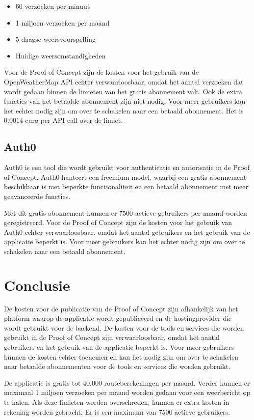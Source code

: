 \begin{itemize}
    \item 60 verzoeken per minuut
    \item 1 miljoen verzoeken per maand
    \item 5-daagse weersvoorspelling
    \item Huidige weersomstandigheden
\end{itemize}

Voor de Proof of Concept zijn de kosten voor het gebruik van de OpenWeatherMap API echter verwaarloosbaar, omdat het aantal verzoeken dat wordt gedaan binnen de limieten van het gratis abonnement valt. Ook de extra functies van het betaalde abonnement zijn niet nodig. Voor meer gebruikers kan het echter nodig zijn om over te schakelen naar een betaald abonnement.  Het is 0.0014 euro per API call over de limiet.

\subsection*{Auth0}

Auth0 is een tool die wordt gebruikt voor authenticatie en autorisatie in de Proof of Concept. Auth0 hanteert een freemium model, waarbij een gratis abonnement beschikbaar is met beperkte functionaliteit en een betaald abonnement met meer geavanceerde functies.

Met dit gratis abonnement kunnen er 7500 actieve gebruikers per maand worden geregistreerd. Voor de Proof of Concept zijn de kosten voor het gebruik van Auth0 echter verwaarloosbaar, omdat het aantal gebruikers en het gebruik van de applicatie beperkt is. Voor meer gebruikers kan het echter nodig zijn om over te schakelen naar een betaald abonnement.

\section{Conclusie}%

De kosten voor de publicatie van de Proof of Concept zijn afhankelijk van het platform waarop de applicatie wordt gepubliceerd en de hostingprovider die wordt gebruikt voor de backend. De kosten voor de tools en services die worden gebruikt in de Proof of Concept zijn verwaarloosbaar, omdat het aantal gebruikers en het gebruik van de applicatie beperkt is. Voor meer gebruikers kunnen de kosten echter toenemen en kan het nodig zijn om over te schakelen naar betaalde abonnementen voor de tools en services die worden gebruikt.

De applicatie is gratis tot 40.000 routeberekeningen per maand. Verder kunnen er maximaal 1 miljoen verzoeken per maand worden gedaan voor een weerbericht op te halen. Als deze limieten worden overschreden, kunnen er extra kosten in rekening worden gebracht. Er is een maximum van 7500 actieve gebruikers.



